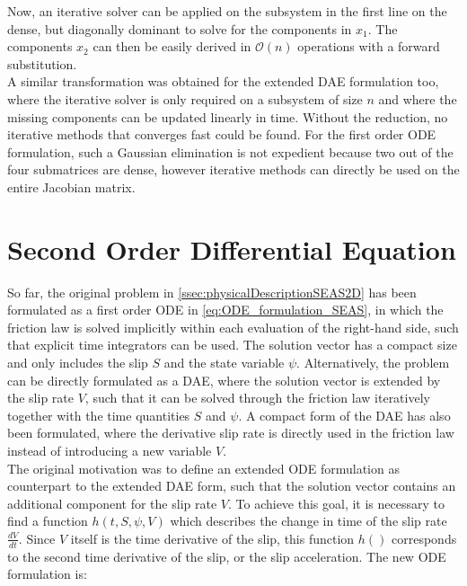 Now, an iterative solver can be applied on the subsystem in the first line on the dense, but diagonally dominant to solve for the components in $x_1$. The components $x_2$ can then be easily derived in $\mathcal{O}(n)$ operations with a forward substitution. \\
A similar transformation was obtained for the extended DAE formulation too, where the iterative solver is only required on a subsystem of size $n$ and where the missing components can be updated linearly in time. Without the reduction, no iterative methods that converges fast could be found. For the first order ODE formulation, such a Gaussian elimination is not expedient because two out of the four submatrices are dense, however iterative methods can directly be used on the entire Jacobian matrix.


\section{Second Order Differential Equation}
So far, the original problem in \autoref{ssec:physicalDescriptionSEAS2D} has been formulated as a first order ODE in \autoref{eq:ODE_formulation_SEAS}, in which the friction law is solved implicitly within each evaluation of the right-hand side, such that explicit time integrators can be used. The solution vector has a compact size and only includes the slip $S$ and the state variable $\psi$. Alternatively, the problem can be directly formulated as a DAE, where the solution vector is extended by the slip rate $V$, such that it can be solved through the friction law iteratively together with the time quantities $S$ and $\psi$. A compact form of the DAE has also been formulated, where the derivative slip rate is directly used in the friction law instead of introducing a new variable $V$. \\
The original motivation was to define an extended ODE formulation as counterpart to the extended DAE form, such that the solution vector contains an additional component for the slip rate $V$. To achieve this goal, it is necessary to find a function $h(t,S,\psi,V)$ which describes the change in time of the slip rate $\frac{dV}{dt}$. Since $V$ itself is the time derivative of the slip, this function $h()$ corresponds to the second time derivative of the slip, or the slip acceleration. The new ODE formulation is: 
